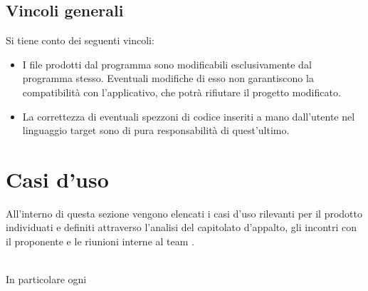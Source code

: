 \subsection{Vincoli generali}
    Si tiene conto dei seguenti vincoli:
    
    \begin{itemize}
    \item I file prodotti dal programma sono modificabili esclusivamente dal programma stesso. Eventuali modifiche di esso non garantiscono la compatibilità con l'applicativo, che potrà rifiutare il progetto modificato.
    \item La correttezza di eventuali spezzoni di codice inseriti a mano dall'utente nel linguaggio target sono di pura responsabilità di quest'ultimo.
    \end{itemize}	
	
	
\newpage

\section{Casi d'uso}
All'interno di questa sezione vengono elencati i casi d'uso rilevanti per il prodotto \proj{} individuati e definiti attraverso l'analisi del capitolato d'appalto, gli incontri con il proponente e le riunioni interne al team \hx{}. 




\\In particolare ogni
